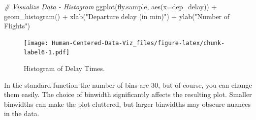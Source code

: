 \documentclass[
]{book}
\newenvironment{Shaded}{\begin{snugshade}}{\end{snugshade}}
\newcommand{\AttributeTok}[1]{\textcolor[rgb]{0.77,0.63,0.00}{#1}}
\newcommand{\CommentTok}[1]{\textcolor[rgb]{0.56,0.35,0.01}{\textit{#1}}}
\newcommand{\FunctionTok}[1]{\textcolor[rgb]{0.00,0.00,0.00}{#1}}
\newcommand{\NormalTok}[1]{#1}
\newcommand{\SpecialCharTok}[1]{\textcolor[rgb]{0.00,0.00,0.00}{#1}}
\newcommand{\StringTok}[1]{\textcolor[rgb]{0.31,0.60,0.02}{#1}}
\begin{document}
\begin{Shaded}
\begin{Highlighting}[]
\CommentTok{\# Visualize Data {-} Histogram}
\FunctionTok{ggplot}\NormalTok{(fly.sample, }\FunctionTok{aes}\NormalTok{(}\AttributeTok{x=}\NormalTok{dep\_delay)) }\SpecialCharTok{+} \FunctionTok{geom\_histogram}\NormalTok{() }\SpecialCharTok{+}
  \FunctionTok{xlab}\NormalTok{(}\StringTok{"Departure delay (in min)"}\NormalTok{) }\SpecialCharTok{+} \FunctionTok{ylab}\NormalTok{(}\StringTok{"Number of Flights"}\NormalTok{)  }
\end{Highlighting}
\end{Shaded}

\begin{figure}
\centering
\texttt{[image: Human-Centered-Data-Viz\_files/figure-latex/chunk-label6-1.pdf]}
\caption{\label{fig:chunk-label6}Histogram of Delay Times.}
\end{figure}

In the standard function the number of bins are 30, but of course, you can change them easily. The choice of binwidth significantly affects the resulting plot. Smaller binwidths can make the plot cluttered, but larger binwidths may obscure nuances in the data.
\end{document}
